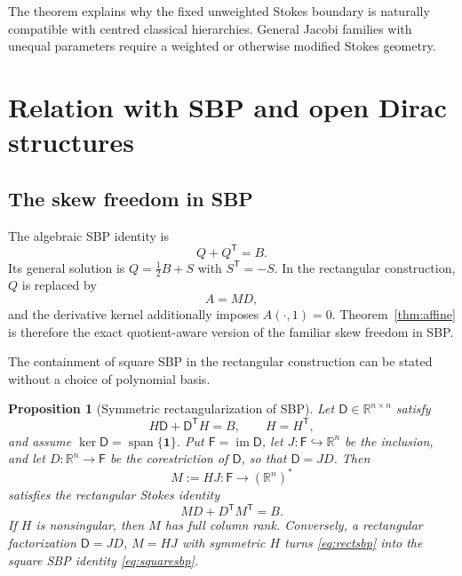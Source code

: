 \documentclass[11pt,a4paper]{article}
\newtheorem{proposition}[theorem]{Proposition}
\theoremstyle{definition}
\theoremstyle{remark}
\newcommand{\R}{\mathbb{R}}
\newcommand{\Ker}{\operatorname{ker}}
\newcommand{\im}{\operatorname{im}}
\newcommand{\spanof}{\operatorname{span}}
\begin{document}
The theorem explains why the fixed unweighted Stokes boundary is naturally compatible with
centred classical hierarchies.  General Jacobi families with unequal parameters require a
weighted or otherwise modified Stokes geometry.

\section{Relation with SBP and open Dirac structures}

\subsection{The skew freedom in SBP}

The algebraic SBP identity is
\begin{equation}\label{eq:sbp}
 Q+Q^{\mathsf T}=B.
\end{equation}
Its general solution is $Q=\tfrac12B+S$ with $S^{\mathsf T}=-S$.  In the rectangular
construction, $Q$ is replaced by
\[
 A=MD,
\]
and the derivative kernel additionally imposes $A(\cdot,1)=0$.  Theorem~\ref{thm:affine}
is therefore the exact quotient-aware version of the familiar skew freedom in SBP.

The containment of square SBP in the rectangular construction can be stated without a
choice of polynomial basis.

\begin{proposition}[Symmetric rectangularization of SBP]\label{thm:sbpinstance}
Let $\mathsf D\in\R^{n\times n}$ satisfy
\begin{equation}\label{eq:squaresbp}
 H\mathsf D+\mathsf D^{\mathsf T}H=B,
 \qquad H=H^{\mathsf T},
\end{equation}
and assume $\Ker\mathsf D=\spanof\{\bm 1\}$.  Put
$\mathsf F=\im\mathsf D$, let $J:\mathsf F\hookrightarrow\R^n$ be the inclusion, and let
$D:\R^n\to\mathsf F$ be the corestriction of $\mathsf D$, so that $\mathsf D=JD$.
Then
\begin{equation}\label{eq:rectfromsquare}
 M:=HJ:\mathsf F\longrightarrow(\R^n)^*
\end{equation}
satisfies the rectangular Stokes identity
\begin{equation}\label{eq:rectsbp}
 MD+D^{\mathsf T}M^{\mathsf T}=B.
\end{equation}
If $H$ is nonsingular, then $M$ has full column rank.  Conversely, a rectangular factorization
$\mathsf D=JD$, $M=HJ$ with symmetric $H$ turns \eqref{eq:rectsbp} into the square SBP
identity \eqref{eq:squaresbp}.
\end{proposition}
\end{document}

